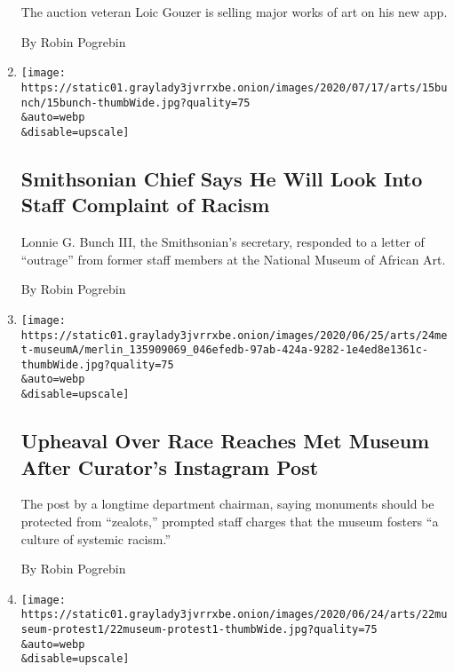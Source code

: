 \begin{enumerate}
  The auction veteran Loic Gouzer is selling major works of art on his
  new app.

  By Robin Pogrebin
\item
  \href{/2020/07/15/arts/design/smithsonian-chief-racism-museum-of-african-art.html}{}

  \texttt{[image: https://static01.graylady3jvrrxbe.onion/images/2020/07/17/arts/15bunch/15bunch-thumbWide.jpg?quality=75\\\&auto=webp\\\&disable=upscale]}

  \hypertarget{smithsonian-chief-says-he-will-look-into-staff-complaint-of-racism}{%
  \subsection{Smithsonian Chief Says He Will Look Into Staff Complaint
  of
  Racism}\label{smithsonian-chief-says-he-will-look-into-staff-complaint-of-racism}}

  Lonnie G. Bunch III, the Smithsonian's secretary, responded to a
  letter of ``outrage'' from former staff members at the National Museum
  of African Art.

  By Robin Pogrebin
\item
  \href{/2020/06/24/arts/design/met-museum-staff-letter-racism.html}{}

  \texttt{[image: https://static01.graylady3jvrrxbe.onion/images/2020/06/25/arts/24met-museumA/merlin\_135909069\_046efedb-97ab-424a-9282-1e4ed8e1361c-thumbWide.jpg?quality=75\\\&auto=webp\\\&disable=upscale]}

  \hypertarget{upheaval-over-race-reaches-met-museum-after-curators-instagram-post}{%
  \subsection{Upheaval Over Race Reaches Met Museum After Curator's
  Instagram
  Post}\label{upheaval-over-race-reaches-met-museum-after-curators-instagram-post}}

  The post by a longtime department chairman, saying monuments should be
  protected from ``zealots,'' prompted staff charges that the museum
  fosters ``a culture of systemic racism.''

  By Robin Pogrebin
\item
  \href{/2020/06/22/arts/design/guggenheim-curators-racism-sexism.html}{}

  \texttt{[image: https://static01.graylady3jvrrxbe.onion/images/2020/06/24/arts/22museum-protest1/22museum-protest1-thumbWide.jpg?quality=75\\\&auto=webp\\\&disable=upscale]}


\end{enumerate}
